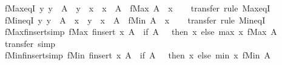 \begin{isabellebody}
\isamarkupfalse%
\ fMax{\isacharunderscore}eqI{\isacharcolon}\ {\isachardoublequoteopen}{\isacharparenleft}{\isasymAnd}y{\isachardot}\ y\ {\isacharbar}{\isasymin}{\isacharbar}\ A\ {\isasymLongrightarrow}\ y\ {\isasymle}\ x{\isacharparenright}\ {\isasymLongrightarrow}\ x\ {\isacharbar}{\isasymin}{\isacharbar}\ A\ {\isasymLongrightarrow}\ fMax\ A\ {\isacharequal}\ x{\isachardoublequoteclose}\isanewline
%
\isadelimproof
\ \ %
\endisadelimproof
%
\isatagproof
{}\isamarkupfalse%
\ transfer\ {\isacharparenleft}rule\ Max{\isacharunderscore}eqI{\isacharparenright}%
\endisatagproof
{\isafoldproof}%
%
\isadelimproof
\isanewline
%
\endisadelimproof
\isanewline
{}\isamarkupfalse%
\ fMin{\isacharunderscore}eqI{\isacharcolon}\ {\isachardoublequoteopen}{\isacharparenleft}{\isasymAnd}y{\isachardot}\ y\ {\isacharbar}{\isasymin}{\isacharbar}\ A\ {\isasymLongrightarrow}\ x\ {\isasymle}\ y{\isacharparenright}\ {\isasymLongrightarrow}\ x\ {\isacharbar}{\isasymin}{\isacharbar}\ A\ {\isasymLongrightarrow}\ fMin\ A\ {\isacharequal}\ x{\isachardoublequoteclose}\isanewline
%
\isadelimproof
\ \ %
\endisadelimproof
%
\isatagproof
{}\isamarkupfalse%
\ transfer\ {\isacharparenleft}rule\ Min{\isacharunderscore}eqI{\isacharparenright}%
\endisatagproof
{\isafoldproof}%
%
\isadelimproof
\isanewline
%
\endisadelimproof
\isanewline
{}\isamarkupfalse%
\ fMax{\isacharunderscore}finsert{\isacharbrackleft}simp{\isacharbrackright}{\isacharcolon}\ {\isachardoublequoteopen}fMax\ {\isacharparenleft}finsert\ x\ A{\isacharparenright}\ {\isacharequal}\ {\isacharparenleft}if\ A\ {\isacharequal}\ {\isacharbraceleft}{\isacharbar}{\isacharbar}{\isacharbraceright}\ then\ x\ else\ max\ x\ {\isacharparenleft}fMax\ A{\isacharparenright}{\isacharparenright}{\isachardoublequoteclose}\isanewline
%
\isadelimproof
\ \ %
\endisadelimproof
%
\isatagproof
{}\isamarkupfalse%
\ transfer\ simp%
\endisatagproof
{\isafoldproof}%
%
\isadelimproof
\isanewline
%
\endisadelimproof
\isanewline
{}\isamarkupfalse%
\ fMin{\isacharunderscore}finsert{\isacharbrackleft}simp{\isacharbrackright}{\isacharcolon}\ {\isachardoublequoteopen}fMin\ {\isacharparenleft}finsert\ x\ A{\isacharparenright}\ {\isacharequal}\ {\isacharparenleft}if\ A\ {\isacharequal}\ {\isacharbraceleft}{\isacharbar}{\isacharbar}{\isacharbraceright}\ then\ x\ else\ min\ x\ {\isacharparenleft}fMin\ A{\isacharparenright}{\isacharparenright}{\isachardoublequoteclose}\isanewline
%
\isadelimproof
\ \ %
\endisadelimproof
%
\isatagproof
{}\isamarkupfalse%

\end{isabellebody}
